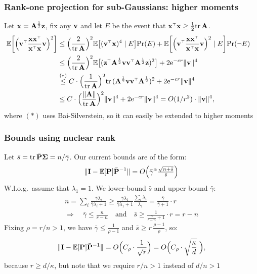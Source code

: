 \documentclass[10pt]{beamer}
\begin{document}
\begin{frame}
    \frametitle{Rank-one projection for sub-Gaussians: higher moments}
Let  $\mathbf x=\mathbf A^{\frac12}\mathbf z$, fix any $\mathbf v$ and let $E$ be the event that
$\x^\top\x\geq \frac12\tr\,\A$.
    \begin{align*}
      \hspace{-3mm}\E\bigg[\Big(\v^\top\frac{\x\x^\top}
      {\x^\top\x}\v\Big)^2\bigg]
      &\leq
        \Big(\frac2{\tr\,\A}\Big)^2\E\big[(\v^\top\x)^4\mid
        E\big]\Pr(E) +
        \E\bigg[\Big(\v^\top\frac{\x\x^\top}
      {\x^\top\x}\v\Big)^2 \mid
        E\bigg]\Pr(\neg E)\\
      &\leq
        \Big(\frac2{\tr\,\A}\Big)^2\E\big[(\z^\top\A^{\frac12}\v\v^\top\A^{\frac12}\z)^2\big]
        + 2\ee^{-c  r} \|\v\|^4\\
      &\overset{(*)}{\leq}
        C\cdot\Big(\frac{1}{\tr\,\A}\Big)^2\tr\,(\A^{\frac12}\v\v^\top\A^{\frac12})^2
        + 2\ee^{-c  r} \|\v\|^4 \\
      &\leq C\cdot
        \Big(\frac{\|\A\|}{\tr\,\A}\Big)^2\|\v\|^4+2\ee^{-cr}\|\v\|^4
        = O(1/r^2)\cdot \|\v\|^4,
    \end{align*}
    where $(*)$ uses Bai-Silverstein, so it can easily be extended to
    higher moments
  \end{frame}

  \begin{frame}
    \frametitle{Bounds using nuclear rank}
    Let $\bar s = \mathrm{tr}\,\bar{\mathbf P}\mathbf{\Sigma} = n/\bar\gamma$. Our current bounds are of the form:
    \begin{align*}
      \|\mathbf I-\mathbb E[\mathbf P]\bar{\mathbf P}^{-1}\| =
      O\Big(\bar\gamma^{\alpha}\tfrac{\sqrt{n+\bar s}}{\bar s}\Big)
    \end{align*}
W.l.o.g.~assume that $\lambda_1=1$. We lower-bound $\bar s$ and upper bound $\bar\gamma$:
    \begin{align*}
n= \sum_i \frac{\bar\gamma\lambda_i}{\bar\gamma\lambda_i + 1}
      \geq
      \frac{\bar\gamma\lambda_1}{\bar\gamma\lambda_1+1}\frac{\sum_i\lambda_i}{\lambda_1}
      = \frac{\bar\gamma}{\bar\gamma+1}\cdot r\\
\Rightarrow \quad
      \bar\gamma\leq \frac n{r-n}
\quad\text{and}\quad
      \bar s\geq \frac1{\frac n{r-n}+1}\cdot r = r-n
    \end{align*}
Fixing $\rho = r/n>1$, we have
    $\bar\gamma\leq \frac1{\rho-1}$ and $\bar s\geq r\,\frac{\rho-1}{\rho}$, so:
    \begin{align*}
      \|\mathbf I-\mathbb E[\mathbf P]\bar{\mathbf P}^{-1}\| = O\Big(C_\rho\cdot\frac1{\sqrt r}\Big)
      = O\Big(C_\rho\cdot\sqrt{\frac{\kappa}{d}}\ \Big),
    \end{align*}
because $r\geq d/\kappa$, but note that we require $r/n>1$ instead of $d/n>1$
  \end{frame}
\end{document}
